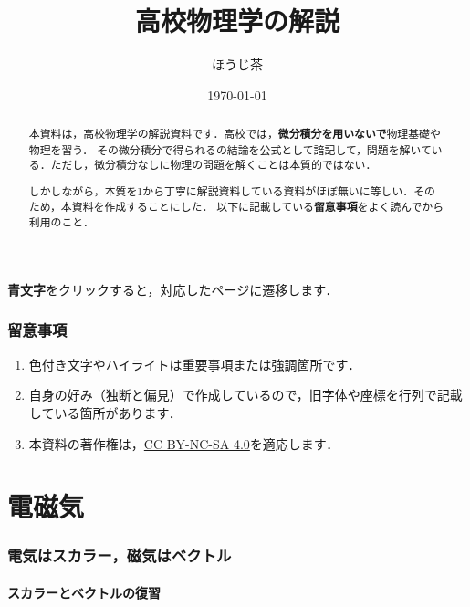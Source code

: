 \documentclass[a4paper,11pt]{ltjsarticle}
\title{高校物理学の解説}
\author{ほうじ茶}
\date{\today}
\begin{document}
\maketitle

\begin{abstract}
  本資料は，高校物理学の解説資料です．高校では，\textbf{微分積分を用いないで}物理基礎や物理を習う．
  その微分積分で得られるの結論を公式として諳記して，問題を解いている．ただし，微分積分なしに物理の問題を解くことは本質的ではない．
  
  しかしながら，本質を1から丁寧に解説資料している資料がほぼ無いに等しい．そのため，本資料を作成することにした．
  以下に記載している\textbf{留意事項}をよく読んでから利用のこと．
\end{abstract}

\tableofcontents

\vspace{12pt}

\begin{center}
  \textbf{\color{blue}青文字}をクリックすると，対応したページに遷移します．
\end{center}

\section*{留意事項}

\begin{enumerate}
  \item 色付き文字やハイライトは重要事項または強調箇所です．
  \item 自身の好み（独断と偏見）で作成しているので，旧字体や座標を行列で記載している箇所があります．
  \item 本資料の著作権は，\href{https://creativecommons.org/licenses/by-nc-sa/4.0}{CC BY-NC-SA 4.0}を適応します．
\end{enumerate}

\clearpage

\part{電磁気}

\section{電気はスカラー，磁気はベクトル}

\subsection{スカラーとベクトルの復習}
\end{document}
